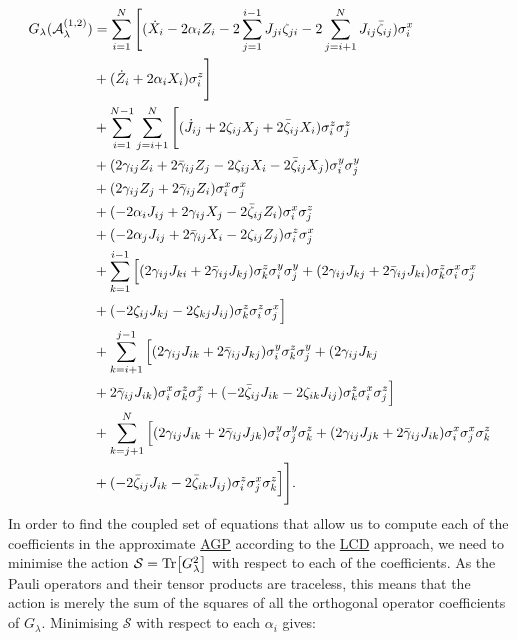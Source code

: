 \documentclass[a4paper,oneside,11pt]{book}
\newcommand{\sx}{\sigma^x}
\newcommand{\sy}{\sigma^y}
\newcommand{\sz}{\sigma^z}
\newcommand{\AGP}[1]{\mathcal{A}_{#1}}
\newcommand{\gammabar}{\Bar{\gamma}}
\newcommand{\zetabar}{\Bar{\zeta}}
\newcommand{\acrref}[1]{\hyperref[acr:#1]{#1}}
\begin{document}
\begin{equation}\label{eq:ising_graph_G_operator}
    \begin{aligned}
        G_{\lambda}(\AGP{\lambda}^{(1,2)}) &= \sum_{i=1}^N \Bigg[ (\dot{X}_i - 2\alpha_i Z_i - 2\sum_{j=1}^{i-1} J_{ji}\zeta_{ji} - 2\sum_{j=i+1}^N J_{ij}\zetabar_{ij})\sx_i \\
        &+ (\dot{Z}_i + 2\alpha_i X_i)\sz_i \Bigg] \\
        &+ \sum_{i = 1}^{N-1} \sum_{j = i+1}^{N} \Bigg[(\dot{J}_{ij} + 2\zeta_{ij} X_j + 2\zetabar_{ij} X_i)\sz_i\sz_j \\
        &+ (2\gamma_{ij}Z_i + 2\gammabar_{ij} Z_j - 2 \zeta_{ij} X_i - 2 \zetabar_{ij} X_j)\sy_i\sy_j \\
        &+ (2\gamma_{ij}Z_j + 2\gammabar_{ij} Z_i)\sx_i\sx_j \\
        &+ (-2\alpha_i J_{ij} + 2\gamma_{ij}X_j - 2\zetabar_{ij} Z_i)\sx_i\sz_j \\
        &+ (-2\alpha_j J_{ij} + 2\gammabar_{ij}X_i - 2\zeta_{ij} Z_j)\sz_i\sx_j \\
        &+ \sum_{k = 1}^{i-1} \Big[ (2\gamma_{ij}J_{ki} + 2\gammabar_{ij} J_{kj})\sz_k\sy_i\sy_j + (2\gamma_{ij}J_{kj} + 2\gammabar_{ij} J_{ki})\sz_k\sx_i\sx_j \\
        &+ (- 2 \zeta_{ij} J_{kj} - 2 \zeta_{kj}J_{ij})\sz_k\sz_i\sx_j \Big] \\
        &+ \sum_{k = i+1}^{j-1} \Big[ (2\gamma_{ij}J_{ik} + 2\gammabar_{ij} J_{kj})\sy_i\sz_k\sy_j + (2\gamma_{ij}J_{kj} \\
        &+ 2\gammabar_{ij} J_{ik})\sx_i\sz_k\sx_j + (- 2 \zetabar_{ij} J_{ik} - 2 \zeta_{ik}J_{ij})\sz_k\sx_i\sz_j \Big] \\
        &+ \sum_{k = j+1}^N \Big[ (2\gamma_{ij}J_{ik} + 2\gammabar_{ij} J_{jk})\sy_i\sy_j\sz_k + (2\gamma_{ij}J_{jk} + 2\gammabar_{ij} J_{ik})\sx_i\sx_j\sz_k \\
        &+ (- 2 \zetabar_{ij} J_{ik} - 2 \zetabar_{ik}J_{ij})\sz_i\sx_j\sz_k \Big] \Bigg].
    \end{aligned}
\end{equation}
In order to find the coupled set of equations that allow us to compute each of the coefficients in the approximate \acrref{AGP} according to the \acrref{LCD} approach, we need to minimise the action $\mathcal{S} = \Tr[G_{\lambda}^2]$ with respect to each of the coefficients. As the Pauli operators and their tensor products are traceless, this means that the action is merely the sum of the squares of all the orthogonal operator coefficients of $G_{\lambda}$. Minimising $\mathcal{S}$ with respect to each $\alpha_i$ gives:
\end{document}

